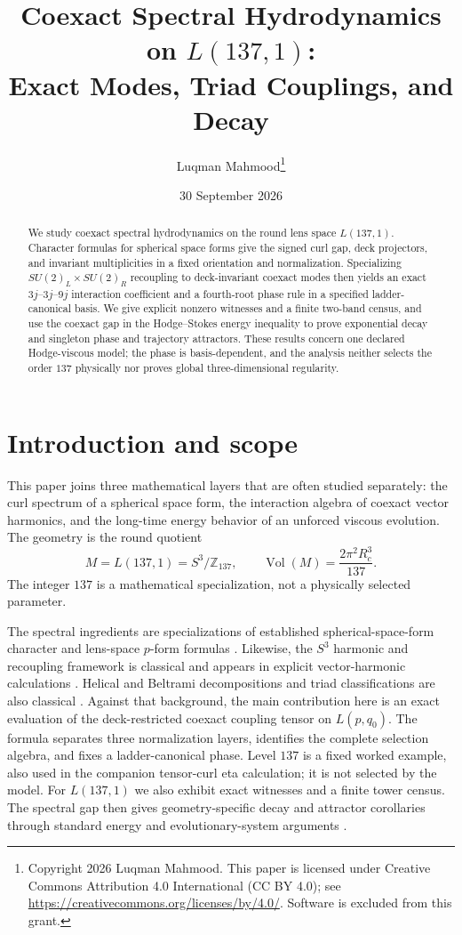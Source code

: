 \documentclass[12pt]{article}
\title{Coexact Spectral Hydrodynamics on $L(137,1)$:\\
Exact Modes, Triad Couplings, and Decay}
\author{Luqman Mahmood\thanks{Copyright 2026 Luqman Mahmood. This paper is licensed under Creative Commons Attribution 4.0 International (CC BY 4.0); see \url{https://creativecommons.org/licenses/by/4.0/}. Software is excluded from this grant.}}
\date{30 September 2026}
\theoremstyle{definition}
\theoremstyle{remark}
\newcommand{\ZZ}{\mathbb Z}
\newcommand{\vol}{\operatorname{Vol}}
\begin{document}
\maketitle

\begin{abstract}
We study coexact spectral hydrodynamics on the round lens space $L(137,1)$.
Character formulas for spherical space forms give the signed curl gap,
deck projectors, and invariant multiplicities in a fixed orientation and
normalization.  Specializing $SU(2)_L\times SU(2)_R$ recoupling to
deck-invariant coexact modes then yields an exact
$3j$--$3j$--$9j$ interaction coefficient and a fourth-root phase rule in a
specified ladder-canonical basis.  We give explicit nonzero witnesses and a
finite two-band census, and use the coexact gap in the Hodge--Stokes energy
inequality to prove exponential decay and singleton phase and trajectory
attractors.  These results concern one declared Hodge-viscous model; the
phase is basis-dependent, and the analysis neither selects the order $137$
physically nor proves global three-dimensional regularity.
\end{abstract}

\section{Introduction and scope}\label{sec:introduction}

This paper joins three mathematical layers that are often studied separately:
the curl spectrum of a spherical space form, the interaction algebra of
coexact vector harmonics, and the long-time energy behavior of an unforced
viscous evolution.  The geometry is the
round quotient
\[
 M=L(137,1)=S^3/\ZZ_{137}, \qquad
 \vol(M)=\frac{2\pi^2R_c^3}{137}.
\]
The integer $137$ is a mathematical specialization, not a physically selected
parameter.

The spectral ingredients are specializations of established spherical-space-form
character and lens-space $p$-form formulas
\cite{Bar2019,Lauret2018,IkedaYamamoto1979,Ikeda1980Lens,BenAchour2016,
ChandrasekharKendall1957}.  Likewise, the $S^3$ harmonic and
recoupling framework is classical and appears in explicit vector-harmonic
calculations \cite{HamadaHorata2003,BaigueraEtAl2021}.  Helical and Beltrami
decompositions and triad classifications are also classical
\cite{ConstantinMajda1988,Waleffe1992,Waleffe1993}.  Against that background,
the main contribution here is an exact evaluation of the deck-restricted
coexact coupling tensor on $L(p,q_0)$.  The formula separates three
normalization layers, identifies the complete selection algebra, and fixes a
ladder-canonical phase.  Level $137$ is a fixed worked example, also used in
the companion tensor-curl eta calculation; it is not selected by the model.
For $L(137,1)$ we also exhibit exact witnesses and a
finite tower census.  The spectral gap then gives geometry-specific decay and
attractor corollaries through standard energy and evolutionary-system
arguments \cite{CheskidovFoias2006}.
\end{document}
